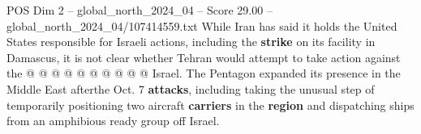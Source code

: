 \begin{textsample}{POS Dim 2 – global\_north\_2024\_04 – Score 29.00 – global\_north\_2024\_04/107414559.txt}
While Iran has said it holds the United States responsible for Israeli actions, including the \textbf{strike} on its facility in Damascus, it is not clear whether Tehran would attempt to take action against the @ @ @ @ @ @ @ @ @ @ Israel.
The Pentagon expanded its presence in the Middle East afterthe Oct. 7 \textbf{attacks}, including taking the unusual step of temporarily positioning two aircraft \textbf{carriers} in the \textbf{region} and dispatching ships from an amphibious ready group off Israel.

\end{textsample}

